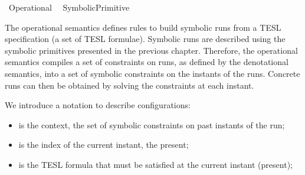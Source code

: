 %
\begin{isabellebody}%
%
%
\isadelimdocument
%
\endisadelimdocument
%
\isatagdocument
%
\isamarkuptrue%
%
\endisatagdocument
{\isafolddocument}%
%
\isadelimdocument
%
\endisadelimdocument
%
\begin{isamarkuptext}%
\label{chap:operational_semantics}%
\end{isamarkuptext}\isamarkuptrue%
%
\isadelimtheory
%
\endisadelimtheory
%
\isatagtheory
{}\isamarkupfalse%
\ Operational\isanewline
{}\isanewline
\ \ SymbolicPrimitive\isanewline
\isanewline
{}%
\endisatagtheory
{\isafoldtheory}%
%
\isadelimtheory
%
\endisadelimtheory
%
\begin{isamarkuptext}%
The operational semantics defines rules to build symbolic runs from a TESL 
  specification (a set of TESL formulae).
  Symbolic runs are described using the symbolic primitives presented in the 
  previous chapter.
  Therefore, the operational semantics compiles a set of constraints on runs, 
  as defined by the denotational semantics, into a set of symbolic constraints 
  on the instants of the runs. Concrete runs can then be obtained by solving the 
  constraints at each instant.%
\end{isamarkuptext}\isamarkuptrue%
%
\isadelimdocument
%
\endisadelimdocument
%
\isatagdocument
%
\isamarkuptrue%
%
\endisatagdocument
{\isafolddocument}%
%
\isadelimdocument
%
\endisadelimdocument
%
\begin{isamarkuptext}%
We introduce a notation to describe configurations:

%
\begin{itemize}%
\item \isa{{\isasymGamma}} is the context, the set of symbolic constraints on past instants of the run;

\item {} is the index of the current instant, the present;

\item \isa{{\isasymPsi}} is the TESL formula that must be satisfied at the current instant (present);


\end{itemize}
\end{isamarkuptext}
\end{isabellebody}

